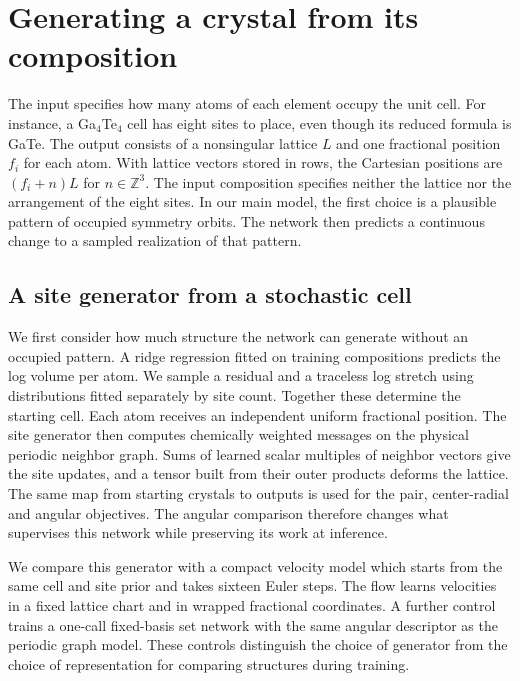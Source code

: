 \section{Generating a crystal from its composition}
\label{sec:crystal-generator}

The input specifies how many atoms of each element occupy the unit cell. For instance, a Ga$_4$Te$_4$ cell has eight sites to place, even though its reduced formula is GaTe. The output consists of a nonsingular lattice $L$ and one fractional position $f_i$ for each atom. With lattice vectors stored in rows, the Cartesian positions are $(f_i+n)L$ for $n\in\mathbb Z^3$. The input composition specifies neither the lattice nor the arrangement of the eight sites. In our main model, the first choice is a plausible pattern of occupied symmetry orbits. The network then predicts a continuous change to a sampled realization of that pattern.

\subsection{A site generator from a stochastic cell}

We first consider how much structure the network can generate without an occupied pattern. A ridge regression fitted on training compositions predicts the log volume per atom. We sample a residual and a traceless log stretch using distributions fitted separately by site count. Together these determine the starting cell. Each atom receives an independent uniform fractional position. The site generator then computes chemically weighted messages on the physical periodic neighbor graph. Sums of learned scalar multiples of neighbor vectors give the site updates, and a tensor built from their outer products deforms the lattice. The same map from starting crystals to outputs is used for the pair, center-radial and angular objectives. The angular comparison therefore changes what supervises this network while preserving its work at inference.

We compare this generator with a compact velocity model which starts from the same cell and site prior and takes sixteen Euler steps. The flow learns velocities in a fixed lattice chart and in wrapped fractional coordinates. A further control trains a one-call fixed-basis set network with the same angular descriptor as the periodic graph model. These controls distinguish the choice of generator from the choice of representation for comparing structures during training.


